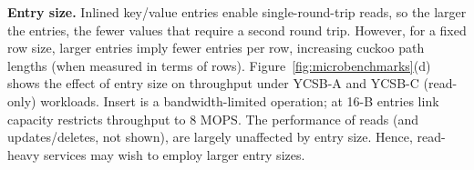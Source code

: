 





\textbf{Entry size.}
\label{sec:entry_size}
Inlined key/value entries enable single-round-trip
reads, so the larger the entries, the fewer values that
require a second round trip.  However, for a fixed row size,
larger entries imply fewer entries per row, increasing
cuckoo path lengths (when measured in terms of rows).
Figure~\ref{fig:microbenchmarks}(d) shows the effect of entry
size on throughput under YCSB-A and YCSB-C (read-only) workloads. Insert is a
bandwidth-limited operation;
at 16-B entries link capacity restricts throughput to 8
MOPS. The performance of reads (and updates/deletes, not
shown), are largely unaffected by entry
size.  Hence,
read-heavy services may wish to
employ larger entry sizes.
%





